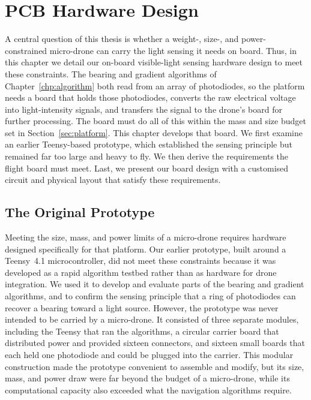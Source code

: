 \chapter{PCB Hardware Design}
\label{chp:hardware}

A central question of this thesis is whether a weight-, size-, and power-constrained micro-drone can carry the light sensing it needs on board. Thus, in this chapter we detail our on-board visible-light sensing hardware design to meet these constraints. The bearing and gradient algorithms of Chapter~\ref{chp:algorithm} both read from an array of photodiodes, so the platform needs a board that holds those photodiodes, converts the raw electrical voltage into light-intensity signals, and transfers the signal to the drone's board for further processing. The board must do all of this within the mass and size budget set in Section~\ref{sec:platform}. This chapter develops that board. We first examine an earlier Teensy-based prototype, which established the sensing principle but remained far too large and heavy to fly. We then derive the requirements the flight board must meet. Last, we present our board design with a customised circuit and physical layout that satisfy these requirements.

\section{The Original Prototype}
\label{sec:original-prototype}

Meeting the size, mass, and power limits of a micro-drone requires hardware designed specifically for that platform. Our earlier prototype, built around a Teensy~4.1 microcontroller, did not meet these constraints because it was developed as a rapid algorithm testbed rather than as hardware for drone integration. We used it to develop and evaluate parts of the bearing and gradient algorithms, and to confirm the sensing principle that a ring of photodiodes can recover a bearing toward a light source. However, the prototype was never intended to be carried by a micro-drone. It consisted of three separate modules, including the Teensy that ran the algorithms, a circular carrier board that distributed power and provided sixteen connectors, and sixteen small boards that each held one photodiode and could be plugged into the carrier. This modular construction made the prototype convenient to assemble and modify, but its size, mass, and power draw were far beyond the budget of a micro-drone, while its computational capacity also exceeded what the navigation algorithms require.


